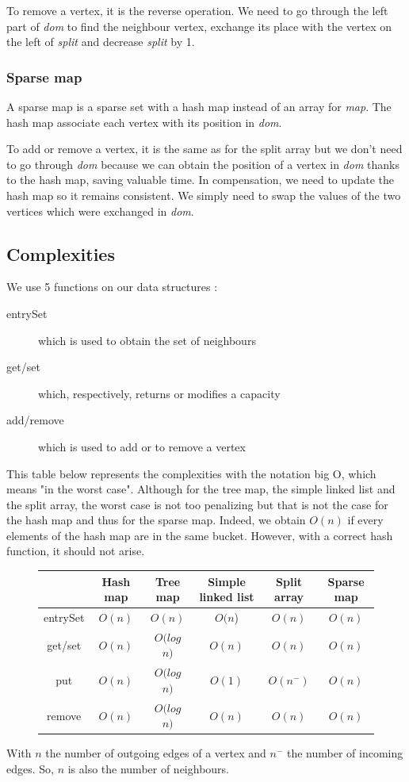 To remove a vertex, it is the reverse operation. We need to go through the left part of \textit{dom} to find the neighbour vertex, exchange its place with the vertex on the left of \textit{split} and decrease \textit{split} by 1.
\subsubsection{Sparse map}
A sparse map is a sparse set with a hash map instead of an array for \textit{map}. The hash map associate each vertex with its position in \textit{dom}.

To add or remove a vertex, it is the same as for the split array but we don't need to go through \textit{dom} because we can obtain the position of a vertex in \textit{dom} thanks to the hash map, saving valuable time. In compensation, we need to update the hash map so it remains consistent. We simply need to swap the values of the two vertices which were exchanged in \textit{dom}.

\newpage

\subsection{Complexities}

We use 5 functions on our data structures :
\begin{description}
\item[entrySet] which is used to obtain the set of neighbours
\item[get/set] which, respectively, returns or modifies a capacity
\item[add/remove] which is used to add or to remove a vertex
\end{description}


This table below represents the complexities with the notation big O, which means "in the worst case". Although for the tree map, the simple linked list and the split array, the worst case is not too penalizing but that is not the case for the hash map and thus for the sparse map. Indeed, we obtain $O(n)$ if every elements of the hash map are in the same bucket. However, with a correct hash function, it should not arise. \newline
\begin{figure}[H]
\centering
\begin{tabular}{|c|c|c|c|c|c|}
	\hline
     & \textbf{Hash map} & \textbf{Tree map} & \textbf{Simple linked list} & \textbf{Split array} & \textbf{Sparse map}\\
     \hline	
   entrySet & $O(n)$ & $O(n)$ & $O(n$) & $O(n)$ & $O(n)$ \\
   get/set & $O(n)$ & $O(log$ $n)$ & $O(n)$ & $O(n)$ & $O(n)$ \\
   put & $O(n)$ & $O(log$ $n)$ & $O(1)$ & $O(n^-)$ & $O(n)$ \\
   remove & $O(n)$ & $O(log$ $n)$ & $O(n)$ & $O(n)$ & $O(n)$ \\
   \hline
\end{tabular} 
\end{figure}

With $n$ the number of outgoing edges of a vertex and $n^-$ the number of incoming edges. So, $n$ is also the number of neighbours.